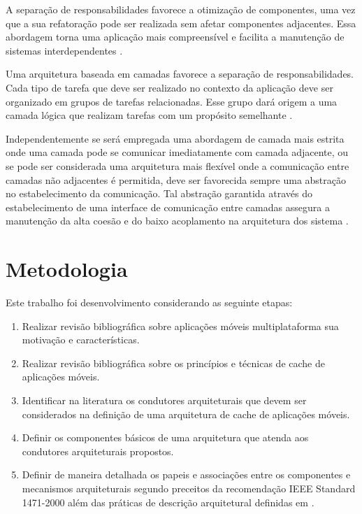 \documentclass[
	article,			%
	11pt,				%
	oneside,			%
	a4paper,			%
	english,			%
	brazil,				%
	sumario=tradicional
]{abntex2}
\begin{document}
A separação de responsabilidades favorece a otimização de componentes, uma vez que a sua refatoração pode ser realizada sem afetar componentes adjacentes. Essa abordagem torna uma aplicação mais compreensível e facilita a manutenção de sistemas interdependentes \cite{meier2009microsoft}.

Uma arquitetura baseada em camadas favorece a separação de responsabilidades. Cada tipo de tarefa que deve ser realizado no contexto da aplicação deve ser organizado em grupos de tarefas relacionadas. Esse grupo dará origem a uma camada lógica que realizam tarefas com um propósito semelhante \cite{meier2009microsoft}. 

Independentemente se será empregada uma abordagem de camada mais estrita onde uma camada pode se comunicar imediatamente com camada adjacente, ou se pode ser considerada uma arquitetura mais flexível onde a comunicação entre camadas não adjacentes é permitida, deve ser favorecida sempre uma abstração no estabelecimento da comunicação. Tal abstração garantida através do estabelecimento de uma interface de comunicação entre camadas assegura a manutenção da alta coesão e do baixo acoplamento na arquitetura dos sistema \cite{meier2009microsoft}.

\chapter{Metodologia}
Este trabalho foi desenvolvimento considerando as seguinte etapas:

\begin{enumerate}
	
	\item Realizar revisão bibliográfica sobre aplicações móveis multiplataforma sua motivação e características.
	
	\item Realizar revisão bibliográfica sobre os princípios e técnicas de cache de aplicações móveis.
	
	\item Identificar na literatura os condutores arquiteturais que devem ser considerados na definição de uma arquitetura de cache de aplicações móveis.
	
	\item Definir os componentes básicos de uma arquitetura que atenda aos condutores arquiteturais propostos.
	
	\item Definir de maneira detalhada os papeis e associações entre os componentes e mecanismos arquiteturais segundo preceitos da recomendação IEEE Standard 1471-2000 além das práticas de descrição arquitetural definidas em \cite{bass2012practice}\cite{bachmann2010DocumentingSoftware}.
	
\end{enumerate}
\end{document}
